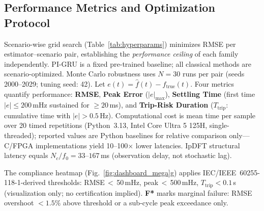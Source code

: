 \subsection{Performance Metrics and Optimization Protocol}
\label{sec:metrics}

Scenario-wise grid search (Table~\ref{tab:hyperparams}) minimizes RMSE
per estimator--scenario pair, establishing the \emph{performance ceiling}
of each family independently. PI-GRU is a fixed pre-trained baseline;
all classical methods are scenario-optimized. Monte Carlo robustness uses
$N\!=\!30$ runs per pair (seeds 2000--2029; tuning seed: 42).
Let $e(t)=\hat{f}(t)-f_{\mathrm{true}}(t)$.
Four metrics quantify performance: \textbf{RMSE},
\textbf{Peak Error} ($|e|_{\max}$),
\textbf{Settling Time} (first time $|e|\leq\!200$\,mHz sustained for
$\geq\!20$\,ms), and \textbf{Trip-Risk Duration} ($T_{\mathrm{trip}}$:
cumulative time with $|e|>0.5$\,Hz).
Computational cost is mean time per sample over 20 timed repetitions
(Python~3.13, Intel Core Ultra 5 125H, single-threaded); reported values
are Python baselines for relative comparison only---C/FPGA implementations
yield 10--100$\times$ lower latencies. IpDFT structural latency equals
$N_c/f_0 = 33$--$167$\,ms (observation delay, not stochastic lag).

The compliance heatmap (Fig.~\ref{fig:dashboard_mega}g) applies
IEC/IEEE~60255-118-1-derived thresholds: RMSE\,$<$\,50\,mHz,
peak\,$<$\,500\,mHz, $T_{\mathrm{trip}}<0.1$\,s (visualization only;
no certification implied). \textbf{F*} marks marginal failure: RMSE
overshoot $<\!1.5\%$ above threshold or a sub-cycle peak exceedance only.


